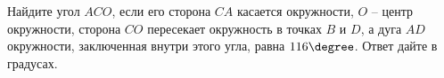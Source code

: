 \begin{ex}
	\begin{condition}
		Найдите угол \( ACO \), если его сторона \( CA \) касается окружности, \( O \) – центр окружности, сторона \( CO \) пересекает окружность в точках \( B \) и \( D \), а дуга \( AD \) окружности, заключенная внутри этого угла, равна \( 116\degree \). Ответ дайте в градусах.
	\end{condition}
\end{ex}